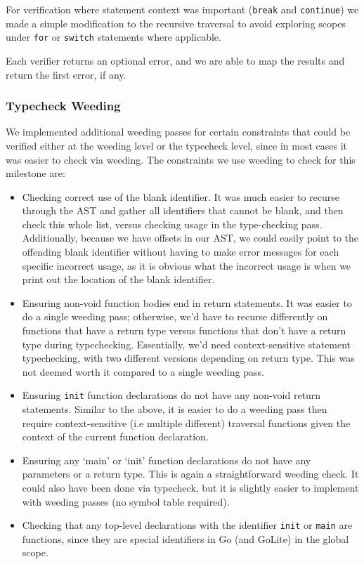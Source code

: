 \documentclass[11pt]{article}
\begin{document}
For verification where statement context was important (\texttt{break} and
\texttt{continue}) we made a simple modification to the recursive traversal
to avoid exploring scopes under \texttt{for} or \texttt{switch} statements
where applicable.

Each verifier returns an optional error, and we are able to map the
results and return the first error, if any.
\subsubsection{Typecheck Weeding}
We implemented additional weeding passes for certain constraints
that could be verified either at the weeding level or the typecheck
level, since in most cases it was easier to check via weeding. The
constraints we use weeding to check for this milestone are:
\begin{itemize}
\item Checking correct use of the blank identifier. It was much easier to recurse
through the AST and gather all identifiers that cannot be blank,
and then check this whole list, versus checking usage in the
type-checking pass. Additionally, because we have offsets in our
AST, we could easily point to the offending blank identifier
without having to make error messages for each specific incorrect
usage, as it is obvious what the incorrect usage is when we print
out the location of the blank identifier.
\item Ensuring non-void function bodies end in return statements. It was easier to
do a single weeding pass; otherwise, we'd have to recurse
differently on functions that have a return type versus functions
that don't have a return type during typechecking. Essentially,
we'd need context-sensitive statement typechecking, with two
different versions depending on return type. This was not deemed
worth it compared to a single weeding pass.
\item Ensuring \texttt{init} function declarations do not have any non-void return
statements. Similar to the above, it is easier to do a weeding
pass then require context-sensitive (i.e multiple different)
traversal functions given the context of the current function
declaration.
\item Ensuring any `main' or `init' function declarations do not have any
parameters or a return type. This is again a straightforward
weeding check.  It could also have been done via typecheck, but it
is slightly easier to implement with weeding passes (no symbol
table required).
\item Checking that any top-level declarations with the identifier \texttt{init} or
\texttt{main} are functions, since they are special identifiers in Go
(and GoLite) in the global scope.
\end{itemize}
\end{document}
